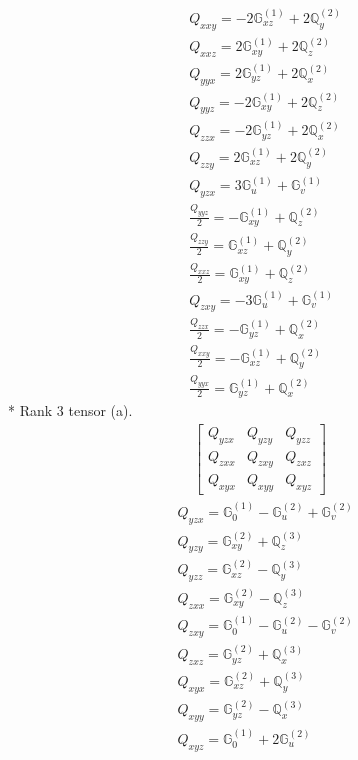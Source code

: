 \documentclass[fleqn,8pt,landscape]{jsarticle}
\begin{document}
\begin{align*}
& Q_{xxy} = - 2 \mathbb{G}_{xz}^{(1)} + 2 \mathbb{Q}_{y}^{(2)} \\
& Q_{xxz} = 2 \mathbb{G}_{xy}^{(1)} + 2 \mathbb{Q}_{z}^{(2)} \\
& Q_{yyx} = 2 \mathbb{G}_{yz}^{(1)} + 2 \mathbb{Q}_{x}^{(2)} \\
& Q_{yyz} = - 2 \mathbb{G}_{xy}^{(1)} + 2 \mathbb{Q}_{z}^{(2)} \\
& Q_{zzx} = - 2 \mathbb{G}_{yz}^{(1)} + 2 \mathbb{Q}_{x}^{(2)} \\
& Q_{zzy} = 2 \mathbb{G}_{xz}^{(1)} + 2 \mathbb{Q}_{y}^{(2)} \\
& Q_{yzx} = 3 \mathbb{G}_{u}^{(1)} + \mathbb{G}_{v}^{(1)} \\
& \frac{Q_{yyz}}{2} = - \mathbb{G}_{xy}^{(1)} + \mathbb{Q}_{z}^{(2)} \\
& \frac{Q_{zzy}}{2} = \mathbb{G}_{xz}^{(1)} + \mathbb{Q}_{y}^{(2)} \\
& \frac{Q_{xxz}}{2} = \mathbb{G}_{xy}^{(1)} + \mathbb{Q}_{z}^{(2)} \\
& Q_{zxy} = - 3 \mathbb{G}_{u}^{(1)} + \mathbb{G}_{v}^{(1)} \\
& \frac{Q_{zzx}}{2} = - \mathbb{G}_{yz}^{(1)} + \mathbb{Q}_{x}^{(2)} \\
& \frac{Q_{xxy}}{2} = - \mathbb{G}_{xz}^{(1)} + \mathbb{Q}_{y}^{(2)} \\
& \frac{Q_{yyx}}{2} = \mathbb{G}_{yz}^{(1)} + \mathbb{Q}_{x}^{(2)}
\end{align*}
* Rank 3 tensor (a).
\begin{align*}
\begin{bmatrix} Q_{yzx} & Q_{yzy} & Q_{yzz} \\ Q_{zxx} & Q_{zxy} & Q_{zxz} \\ Q_{xyx} & Q_{xyy} & Q_{xyz} \end{bmatrix}
\end{align*}
\begin{align*}
& Q_{yzx} = \mathbb{G}_{0}^{(1)} - \mathbb{G}_{u}^{(2)} + \mathbb{G}_{v}^{(2)} \\
& Q_{yzy} = \mathbb{G}_{xy}^{(2)} + \mathbb{Q}_{z}^{(3)} \\
& Q_{yzz} = \mathbb{G}_{xz}^{(2)} - \mathbb{Q}_{y}^{(3)} \\
& Q_{zxx} = \mathbb{G}_{xy}^{(2)} - \mathbb{Q}_{z}^{(3)} \\
& Q_{zxy} = \mathbb{G}_{0}^{(1)} - \mathbb{G}_{u}^{(2)} - \mathbb{G}_{v}^{(2)} \\
& Q_{zxz} = \mathbb{G}_{yz}^{(2)} + \mathbb{Q}_{x}^{(3)} \\
& Q_{xyx} = \mathbb{G}_{xz}^{(2)} + \mathbb{Q}_{y}^{(3)} \\
& Q_{xyy} = \mathbb{G}_{yz}^{(2)} - \mathbb{Q}_{x}^{(3)} \\
& Q_{xyz} = \mathbb{G}_{0}^{(1)} + 2 \mathbb{G}_{u}^{(2)}
\end{align*}
\end{document}
